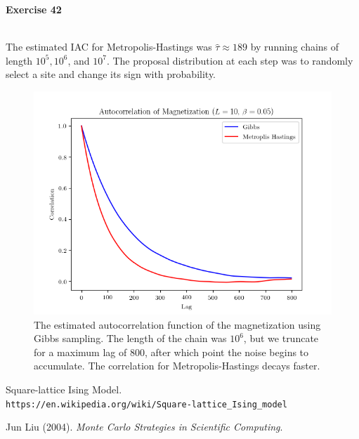 \documentclass[11pt,a4paper]{amsart}
\begin{document}
{\bf Exercise 42}\\
\\
\par The estimated IAC for Metropolis-Hastings was $\hat{\tau} \approx 189$ by running chains of length $10^5, 10^6$, and $10^7$.  The proposal distribution at each step was to randomly select a site and change its sign with probability.

\begin{figure}[H]
\centering
\includegraphics[width=5in]{gibbsMHACF.png}
\caption{The estimated autocorrelation function of the magnetization using Gibbs sampling.  The length of the chain was $10^6$, but we truncate for a maximum lag of 800, after which point the noise begins to accumulate.  The correlation for Metropolis-Hastings decays faster.}
\label{fig:gibbsRandomACFb005}
\end{figure}


\begin{thebibliography}{10}

Square-lattice Ising Model.\\
\texttt{https://en.wikipedia.org/wiki/Square-lattice\_Ising\_model}

\vspace{0.1in}

Jun Liu (2004). \emph{Monte Carlo Strategies in Scientific Computing}.

\end{thebibliography}

\end{document}
